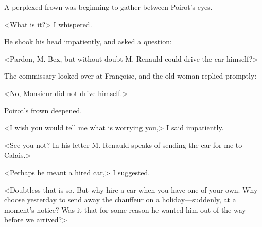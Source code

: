  A perplexed frown was beginning to gather between Poirot's eyes. 

 <What is it?> I whispered. 

 He shook his head impatiently, and asked a question: 

 <Pardon, M. Bex, but without doubt M. Renauld could drive the car himself?> 

 The commissary looked over at Françoise, and the old woman replied promptly: 

 <No, Monsieur did not drive himself.> 

 Poirot's frown deepened. 

 <I wish you would tell me what is worrying you,> I said impatiently. 

 <See you not? In his letter M. Renauld speaks of sending the car for me to Calais.> 

 <Perhaps he meant a hired car,> I suggested. 

 <Doubtless that is so. But why hire a car when you have one of your own. Why choose yesterday to send away the chauffeur on a holiday—suddenly, at a moment's notice? Was it that for some reason he wanted him out of the way before we arrived?>